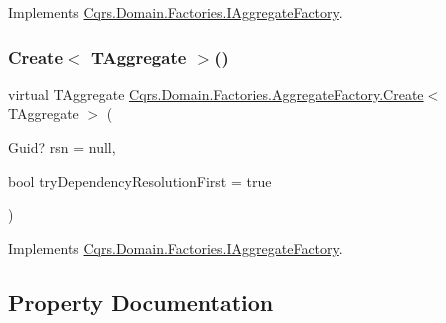 Implements \hyperlink{interfaceCqrs_1_1Domain_1_1Factories_1_1IAggregateFactory_ade388f0dfa9c42964392159a4f97fb1e}{Cqrs.\+Domain.\+Factories.\+I\+Aggregate\+Factory}.

\mbox{\label{classCqrs_1_1Domain_1_1Factories_1_1AggregateFactory_ac155d6c1e55ba37bacf420185b652092}} 
\subsubsection{\texorpdfstring{Create$<$ T\+Aggregate $>$()}{Create< TAggregate >()}}
{\footnotesize\ttfamily virtual T\+Aggregate \hyperlink{classCqrs_1_1Domain_1_1Factories_1_1AggregateFactory_a917794af09bb3f51629e7abc231f8441}{Cqrs.\+Domain.\+Factories.\+Aggregate\+Factory.\+Create}$<$ T\+Aggregate $>$ (\begin{DoxyParamCaption}\item[{Guid?}]{rsn = {\ttfamily null},  }\item[{bool}]{try\+Dependency\+Resolution\+First = {\ttfamily true} }\end{DoxyParamCaption})\hspace{0.3cm}{\ttfamily [virtual]}}



Implements \hyperlink{interfaceCqrs_1_1Domain_1_1Factories_1_1IAggregateFactory_a3dcbf8900e0d536da241e2e94f74cdd5}{Cqrs.\+Domain.\+Factories.\+I\+Aggregate\+Factory}.



\subsection{Property Documentation}
\mbox{\label{classCqrs_1_1Domain_1_1Factories_1_1AggregateFactory_acae0733e4069776322e0c4cb5d335c09}} 
